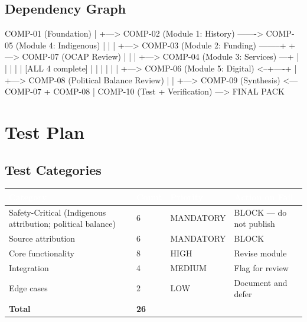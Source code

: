 \documentclass[11pt,letterpaper]{article}
\newcommand{\tableheader}[1]{\textbf{\sffamily\textcolor{white}{#1}}}
\begin{document}
\subsection{Dependency Graph}

\begin{asciibox}
COMP-01 (Foundation)
    |
    +---> COMP-02 (Module 1: History)  -------> COMP-05 (Module 4: Indigenous)
    |         |                                       |
    +---> COMP-03 (Module 2: Funding)  --------+     +---> COMP-07 (OCAP Review)
    |         |                                |
    +---> COMP-04 (Module 3: Services) ---+    |
    |                                     |    |
    |     [ALL 4 complete]                |    |
    |         |                           |    |
    +---> COMP-06 (Module 5: Digital) <--+----+
              |
    +---> COMP-08 (Political Balance Review)
    |         |
    +---> COMP-09 (Synthesis)  <---  COMP-07 + COMP-08
              |
         COMP-10 (Test + Verification)  ---> FINAL PACK
\end{asciibox}

\section{Test Plan}

\subsection{Test Categories}

\begin{center}
\begin{tabularx}{\textwidth}{L{3.5cm}C{1.5cm}L{2cm}X}
\toprule
{}
\tableheader{Category} & \tableheader{Count} & \tableheader{Priority} & \tableheader{Action on Fail} \\
\midrule
Safety-Critical (Indigenous attribution; political balance) & 6 & MANDATORY & BLOCK --- do not publish \\
Source attribution & 6 & MANDATORY & BLOCK \\
Core functionality & 8 & HIGH & Revise module \\
Integration & 4 & MEDIUM & Flag for review \\
Edge cases & 2 & LOW & Document and defer \\
\midrule
\textbf{Total} & \textbf{26} & & \\
\bottomrule
\end{tabularx}
\end{center}
\end{document}
